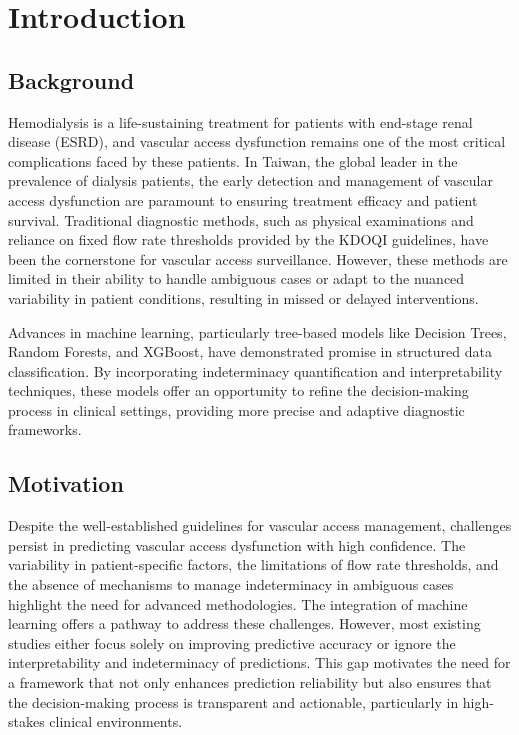 \chapter{Introduction}
\label{chapter:intro}

\section{Background}

Hemodialysis is a life-sustaining treatment for patients with end-stage renal disease (ESRD), and vascular access dysfunction remains one of the most critical complications faced by these patients. In Taiwan, the global leader in the prevalence of dialysis patients, the early detection and management of vascular access dysfunction are paramount to ensuring treatment efficacy and patient survival. Traditional diagnostic methods, such as physical examinations and reliance on fixed flow rate thresholds provided by the KDOQI guidelines, have been the cornerstone for vascular access surveillance. However, these methods are limited in their ability to handle ambiguous cases or adapt to the nuanced variability in patient conditions, resulting in missed or delayed interventions.

Advances in machine learning, particularly tree-based models like Decision Trees, Random Forests, and XGBoost, have demonstrated promise in structured data classification. By incorporating indeterminacy quantification and interpretability techniques, these models offer an opportunity to refine the decision-making process in clinical settings, providing more precise and adaptive diagnostic frameworks.

\section{Motivation}

Despite the well-established guidelines for vascular access management, challenges persist in predicting vascular access dysfunction with high confidence. The variability in patient-specific factors, the limitations of flow rate thresholds, and the absence of mechanisms to manage indeterminacy in ambiguous cases highlight the need for advanced methodologies. The integration of machine learning offers a pathway to address these challenges. However, most existing studies either focus solely on improving predictive accuracy or ignore the interpretability and indeterminacy of predictions. This gap motivates the need for a framework that not only enhances prediction reliability but also ensures that the decision-making process is transparent and actionable, particularly in high-stakes clinical environments.

